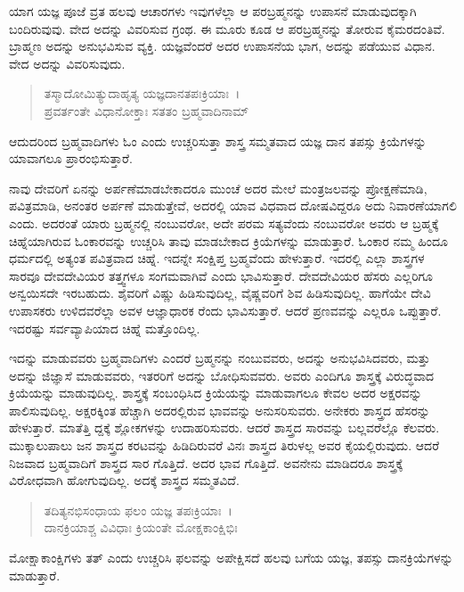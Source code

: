 ಯಾಗ ಯಜ್ಞ ಪೂಜೆ ವ್ರತ ಹಲವು ಆಚಾರಗಳು ಇವುಗಳೆಲ್ಲಾ ಆ ಪರಬ್ರಹ್ಮನನ್ನು ಉಪಾಸನೆ ಮಾಡುವುದಕ್ಕಾಗಿ ಬಂದಿರುವುವು. ವೇದ ಅದನ್ನು ವಿವರಿಸುವ ಗ್ರಂಥ. ಈ ಮೂರು ಕೂಡ ಆ ಪರಬ್ರಹ್ಮನನ್ನು ತೋರುವ ಕೈಮರದಂತಿವೆ. ಬ್ರಾಹ್ಮಣ ಅದನ್ನು ಅನುಭವಿಸುವ ವ್ಯಕ್ತಿ. ಯಜ್ಞವೆಂದರೆ ಅದರ ಉಪಾಸನೆಯ ಭಾಗ, ಅದನ್ನು ಪಡೆಯುವ ವಿಧಾನ. ವೇದ ಅದನ್ನು ವಿವರಿಸುವುದು.

\begin{verse}
ತಸ್ಮಾದೋಮಿತ್ಯುದಾಹೃತ್ಯ ಯಜ್ಞದಾನತಪಃಕ್ರಿಯಾಃ~।\\ಪ್ರವರ್ತಂತೇ ವಿಧಾನೋಕ್ತಾಃ ಸತತಂ ಬ್ರಹ್ಮವಾದಿನಾಮ್ 
\end{verse}

{\small ಆದುದರಿಂದ ಬ್ರಹ್ಮವಾದಿಗಳು ಓಂ ಎಂದು ಉಚ್ಚರಿಸುತ್ತಾ ಶಾಸ್ತ್ರ ಸಮ್ಮತವಾದ ಯಜ್ಞ ದಾನ ತಪಸ್ಸು ಕ್ರಿಯೆಗಳನ್ನು ಯಾವಾಗಲೂ ಪ್ರಾರಂಭಿಸುತ್ತಾರೆ.}

ನಾವು ದೇವರಿಗೆ ಏನನ್ನು ಅರ್ಪಣೆಮಾಡಬೇಕಾದರೂ ಮುಂಚೆ ಅದರ ಮೇಲೆ ಮಂತ್ರಜಲವನ್ನು ಪ್ರೋಕ್ಷಣೆಮಾಡಿ, ಪವಿತ್ರಮಾಡಿ, ಅನಂತರ ಅರ್ಪಣೆ ಮಾಡುತ್ತೇವೆ, ಅದರಲ್ಲಿ ಯಾವ ವಿಧವಾದ ದೋಷವಿದ್ದರೂ ಅದು ನಿವಾರಣೆಯಾಗಲಿ ಎಂದು. ಅದರಂತೆ ಯಾರು ಬ್ರಹ್ಮನಲ್ಲಿ ನಂಬುವರೋ, ಅದೇ ಪರಮ ಸತ್ಯವೆಂದು ನಂಬುವರೋ ಅವರು ಆ ಬ್ರಹ್ಮಕ್ಕೆ ಚಿಹ್ನೆಯಾಗಿರುವ ಓಂಕಾರವನ್ನು ಉಚ್ಚರಿಸಿ ತಾವು ಮಾಡಬೇಕಾದ ಕ್ರಿಯೆಗಳನ್ನು ಮಾಡುತ್ತಾರೆ. ಓಂಕಾರ ನಮ್ಮ ಹಿಂದೂ ಧರ್ಮದಲ್ಲಿ ಅತ್ಯಂತ ಪವಿತ್ರವಾದ ಚಿಹ್ನೆ. ಇದನ್ನೇ ಸಂಕ್ಷಿಪ್ತ ಬ್ರಹ್ಮವೆಂದು ಹೇಳುತ್ತಾರೆ. ಇದರಲ್ಲಿ ಎಲ್ಲಾ ಶಾಸ್ತ್ರಗಳ ಸಾರವೂ ದೇವದೇವಿಯರ ತತ್ತ್ವಗಳೂ ಸಂಗಮವಾಗಿವೆ ಎಂದು ಭಾವಿಸುತ್ತಾರೆ. ದೇವದೇವಿಯರ ಹೆಸರು ಎಲ್ಲರಿಗೂ ಅನ್ವಯಿಸದೇ ಇರಬಹುದು. ಶೈವರಿಗೆ ವಿಷ್ಣು ಹಿಡಿಸುವುದಿಲ್ಲ, ವೈಷ್ಣವರಿಗೆ ಶಿವ ಹಿಡಿಸುವುದಿಲ್ಲ. ಹಾಗೆಯೇ ದೇವಿ ಉಪಾಸಕರು ಉಳಿದವರೆಲ್ಲಾ ಅವಳ ಆಜ್ಞಾಧಾರಕ ರೆಂದು ಭಾವಿಸುತ್ತಾರೆ. ಆದರೆ ಪ್ರಣವವನ್ನು ಎಲ್ಲರೂ ಒಪ್ಪುತ್ತಾರೆ. ಇದರಷ್ಟು ಸರ್ವವ್ಯಾಪಿಯಾದ ಚಿಹ್ನೆ ಮತ್ತೊಂದಿಲ್ಲ. 

ಇದನ್ನು ಮಾಡುವವರು ಬ್ರಹ್ಮವಾದಿಗಳು ಎಂದರೆ ಬ್ರಹ್ಮನನ್ನು ನಂಬುವವರು, ಅದನ್ನು ಅನುಭವಿಸಿದವರು, ಮತ್ತು ಅದನ್ನು ಜಿಜ್ಞಾಸೆ ಮಾಡುವವರು, ಇತರರಿಗೆ ಅದನ್ನು ಬೋಧಿಸುವವರು. ಅವರು ಎಂದಿಗೂ ಶಾಸ್ತ್ರಕ್ಕೆ ವಿರುದ್ಧವಾದ ಕ್ರಿಯೆಯನ್ನು ಮಾಡುವುದಿಲ್ಲ. ಶಾಸ್ತ್ರಕ್ಕೆ ಸಂಬಂಧಿಸಿದ ಕ್ರಿಯೆಯನ್ನು ಮಾಡುವಾಗಲೂ ಕೇವಲ ಅದರ ಅಕ್ಷರವನ್ನು ಪಾಲಿಸುವುದಿಲ್ಲ. ಅಕ್ಷರಕ್ಕಿಂತ ಹೆಚ್ಚಾಗಿ ಅದರಲ್ಲಿರುವ ಭಾವವನ್ನು ಅನುಸರಿಸುವರು. ಅನೇಕರು ಶಾಸ್ತ್ರದ ಹೆಸರನ್ನು ಹೇಳುತ್ತಾರೆ. ಮಾತೆತ್ತಿ ದ್ದಕ್ಕೆ ಶ್ಲೋಕಗಳನ್ನು ಉದಾಹರಿಸುವರು. ಆದರೆ ಶಾಸ್ತ್ರದ ಸಾರವನ್ನು ಬಲ್ಲವರೆಲ್ಲೊ ಕೆಲವರು. ಮುಕ್ಕಾಲುಪಾಲು ಜನ ಶಾಸ್ತ್ರದ ಕರಟವನ್ನು ಹಿಡಿದಿರುವರೆ ವಿನಃ ಶಾಸ್ತ್ರದ ತಿರುಳಲ್ಲ ಅವರ ಕೈಯಲ್ಲಿರುವುದು. ಆದರೆ ನಿಜವಾದ ಬ್ರಹ್ಮವಾದಿಗೆ ಶಾಸ್ತ್ರದ ಸಾರ ಗೊತ್ತಿದೆ. ಅದರ ಭಾವ ಗೊತ್ತಿದೆ. ಅವನೇನು ಮಾಡಿದರೂ ಶಾಸ್ತ್ರಕ್ಕೆ ವಿರೋಧವಾಗಿ ಹೋಗುವುದಿಲ್ಲ. ಅದಕ್ಕೆ ಶಾಸ್ತ್ರದ ಸಮ್ಮತವಿದೆ.

\begin{verse}
ತದಿತ್ಯನಭಿಸಂಧಾಯ ಫಲಂ ಯಜ್ಞ ತಪಃಕ್ರಿಯಾಃ~।\\ದಾನಕ್ರಿಯಾಶ್ಚ ವಿವಿಧಾಃ ಕ್ರಿಯಂತೇ ಮೋಕ್ಷಕಾಂಕ್ಷಿಭಿಃ 
\end{verse}

{\small ಮೋಕ್ಷಾಕಾಂಕ್ಷಿಗಳು ತತ್ ಎಂದು ಉಚ್ಚರಿಸಿ ಫಲವನ್ನು ಅಪೇಕ್ಷಿಸದೆ ಹಲವು ಬಗೆಯ ಯಜ್ಞ, ತಪಸ್ಸು ದಾನಕ್ರಿಯೆಗಳನ್ನು ಮಾಡುತ್ತಾರೆ.}


